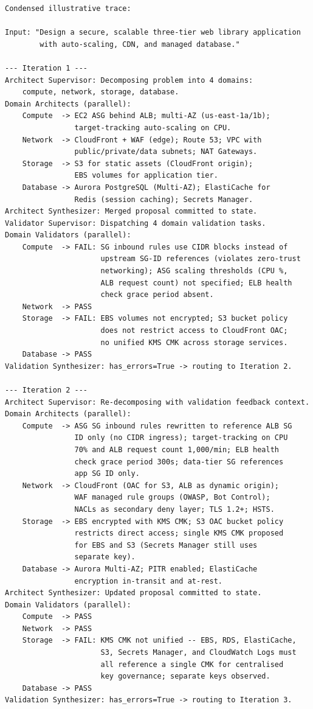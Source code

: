 \begin{verbatim}
Condensed illustrative trace:

Input: "Design a secure, scalable three-tier web library application
        with auto-scaling, CDN, and managed database."

--- Iteration 1 ---
Architect Supervisor: Decomposing problem into 4 domains:
    compute, network, storage, database.
Domain Architects (parallel):
    Compute  -> EC2 ASG behind ALB; multi-AZ (us-east-1a/1b);
                target-tracking auto-scaling on CPU.
    Network  -> CloudFront + WAF (edge); Route 53; VPC with
                public/private/data subnets; NAT Gateways.
    Storage  -> S3 for static assets (CloudFront origin);
                EBS volumes for application tier.
    Database -> Aurora PostgreSQL (Multi-AZ); ElastiCache for
                Redis (session caching); Secrets Manager.
Architect Synthesizer: Merged proposal committed to state.
Validator Supervisor: Dispatching 4 domain validation tasks.
Domain Validators (parallel):
    Compute  -> FAIL: SG inbound rules use CIDR blocks instead of
                      upstream SG-ID references (violates zero-trust
                      networking); ASG scaling thresholds (CPU %,
                      ALB request count) not specified; ELB health
                      check grace period absent.
    Network  -> PASS
    Storage  -> FAIL: EBS volumes not encrypted; S3 bucket policy
                      does not restrict access to CloudFront OAC;
                      no unified KMS CMK across storage services.
    Database -> PASS
Validation Synthesizer: has_errors=True -> routing to Iteration 2.

--- Iteration 2 ---
Architect Supervisor: Re-decomposing with validation feedback context.
Domain Architects (parallel):
    Compute  -> ASG SG inbound rules rewritten to reference ALB SG
                ID only (no CIDR ingress); target-tracking on CPU
                70% and ALB request count 1,000/min; ELB health
                check grace period 300s; data-tier SG references
                app SG ID only.
    Network  -> CloudFront (OAC for S3, ALB as dynamic origin);
                WAF managed rule groups (OWASP, Bot Control);
                NACLs as secondary deny layer; TLS 1.2+; HSTS.
    Storage  -> EBS encrypted with KMS CMK; S3 OAC bucket policy
                restricts direct access; single KMS CMK proposed
                for EBS and S3 (Secrets Manager still uses
                separate key).
    Database -> Aurora Multi-AZ; PITR enabled; ElastiCache
                encryption in-transit and at-rest.
Architect Synthesizer: Updated proposal committed to state.
Domain Validators (parallel):
    Compute  -> PASS
    Network  -> PASS
    Storage  -> FAIL: KMS CMK not unified -- EBS, RDS, ElastiCache,
                      S3, Secrets Manager, and CloudWatch Logs must
                      all reference a single CMK for centralised
                      key governance; separate keys observed.
    Database -> PASS
Validation Synthesizer: has_errors=True -> routing to Iteration 3.


\end{verbatim}
